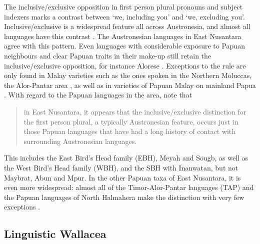 The inclusive/exclusive opposition in first person plural pronouns and subject indexers marks a contrast between `we, including you' and `we, excluding you'. Inclusive/exclusive is a widespread feature all across Austronesia, and almost all languages have this contrast \citep{Tryon1995,klamer2008east}. The Austronesian languages in East Nusantara agree with this pattern. Even languages with considerable exposure to Papuan neighbours and clear Papuan traits in their make-up still retain the inclusive/exclusive opposition, for instance Alorese \citep{klamer2011alorese}. Exceptions to the rule are only found in Malay varieties such as the ones spoken in the Northern Moluccas, the Alor-Pantar area \citep{klamer2008east}, as well as in varieties of Papuan Malay on mainland Papua \citep{kluge2014grammar}. With regard to the Papuan languages in the area, \citet[115]{klamer2008east} note that \begin{quote}in East Nusantara, it appears that the inclusive/exclusive distinction for the first person plural, a typically Austronesian feature,
occurs just in those Papuan languages that have had a long history of contact with surrounding Austronesian languages.\end{quote}
This includes the East Bird's Head family (EBH), Meyah and Sougb, as well as the West Bird's Head family (WBH), and the SBH with Inanwatan, but not Maybrat, Abun and Mpur. In the other Papuan taxa of East Nusantara, it is even more widespread: almost all of the Timor-Alor-Pantar languages (TAP) and the Papuan languages of North Halmahera make the distinction with very few exceptions \citep[115]{klamer2008east}. 

\subsection{Linguistic Wallacea}\label{sec:wallacea}

